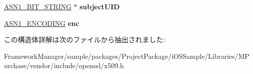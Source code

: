 \begin{DoxyCompactItemize}
\item 
\hypertarget{structx509__cinf__st_a5a8aba3df2b00582cee4b51ab9c9588a}{}\hyperlink{structasn1__string__st}{A\+S\+N1\+\_\+\+B\+I\+T\+\_\+\+S\+T\+R\+I\+N\+G} $\ast$ {\bfseries subject\+U\+I\+D}\label{structx509__cinf__st_a5a8aba3df2b00582cee4b51ab9c9588a}

\item 
\hypertarget{structx509__cinf__st_ad5373b5c6b59286b2c5c9166de0b5284}{}\hyperlink{struct_a_s_n1___e_n_c_o_d_i_n_g__st}{A\+S\+N1\+\_\+\+E\+N\+C\+O\+D\+I\+N\+G} {\bfseries enc}\label{structx509__cinf__st_ad5373b5c6b59286b2c5c9166de0b5284}

\end{DoxyCompactItemize}


この構造体詳解は次のファイルから抽出されました\+:\begin{DoxyCompactItemize}
\item 
Framework\+Manager/sample/packages/\+Project\+Package/i\+O\+S\+Sample/\+Libraries/\+M\+Purchase/vendor/include/openssl/x509.\+h\end{DoxyCompactItemize}
